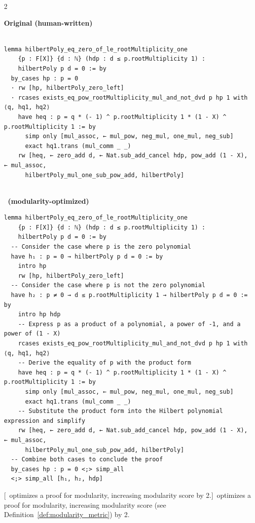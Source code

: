 {
\setlength{\columnsep}{0.2cm}
\begin{paracol}{2}
{
\textbf{Original (human-written)}
\begin{lstlisting}[basicstyle=\tiny\ttfamily]

lemma hilbertPoly_eq_zero_of_le_rootMultiplicity_one
    {p : F[X]} {d : ℕ} (hdp : d ≤ p.rootMultiplicity 1) :
    hilbertPoly p d = 0 := by
  by_cases hp : p = 0
  · rw [hp, hilbertPoly_zero_left]
  · rcases exists_eq_pow_rootMultiplicity_mul_and_not_dvd p hp 1 with ⟨q, hq1, hq2⟩
    have heq : p = q * (- 1) ^ p.rootMultiplicity 1 * (1 - X) ^ p.rootMultiplicity 1 := by
      simp only [mul_assoc, ← mul_pow, neg_mul, one_mul, neg_sub]
      exact hq1.trans (mul_comm _ _)
    rw [heq, ← zero_add d, ← Nat.sub_add_cancel hdp, pow_add (1 - X), ← mul_assoc,
      hilbertPoly_mul_one_sub_pow_add, hilbertPoly]


\end{lstlisting}
}
\switchcolumn
{
\textbf{\ImProver \ (modularity-optimized)}
\begin{lstlisting}[basicstyle=\tiny\ttfamily]
lemma hilbertPoly_eq_zero_of_le_rootMultiplicity_one
    {p : F[X]} {d : ℕ} (hdp : d ≤ p.rootMultiplicity 1) :
    hilbertPoly p d = 0 := by
  -- Consider the case where p is the zero polynomial
  have h₁ : p = 0 → hilbertPoly p d = 0 := by
    intro hp
    rw [hp, hilbertPoly_zero_left]
  -- Consider the case where p is not the zero polynomial
  have h₂ : p ≠ 0 → d ≤ p.rootMultiplicity 1 → hilbertPoly p d = 0 := by
    intro hp hdp
    -- Express p as a product of a polynomial, a power of -1, and a power of (1 - X)
    rcases exists_eq_pow_rootMultiplicity_mul_and_not_dvd p hp 1 with ⟨q, hq1, hq2⟩
    -- Derive the equality of p with the product form
    have heq : p = q * (- 1) ^ p.rootMultiplicity 1 * (1 - X) ^ p.rootMultiplicity 1 := by
      simp only [mul_assoc, ← mul_pow, neg_mul, one_mul, neg_sub]
      exact hq1.trans (mul_comm _ _)
    -- Substitute the product form into the Hilbert polynomial expression and simplify
    rw [heq, ← zero_add d, ← Nat.sub_add_cancel hdp, pow_add (1 - X), ← mul_assoc,
      hilbertPoly_mul_one_sub_pow_add, hilbertPoly]
  -- Combine both cases to conclude the proof
  by_cases hp : p = 0 <;> simp_all
  <;> simp_all [h₁, h₂, hdp]
\end{lstlisting}
}

\end{paracol}
[\ImProver \ optimizes a proof for modularity, increasing modularity score by 2.]{\ImProver \ optimizes a proof for modularity, increasing modularity score (see Definition~\ref{def:modularity_metric}) by 2.}
\label{fig:improver2-modularity-hilbert-poly}
}





